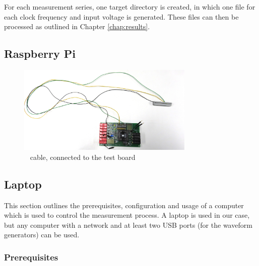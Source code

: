 For each  measurement series, one  target directory  is created, in  which one
file for each clock frequency and  input voltage is generated. These files can
then be processed as outlined in Chapter \ref{chap:results}.


\subsection{Raspberry Pi}
\label{subsec:raspi}


\begin{figure}
    \centering
    \includegraphics[width=0.75\textwidth]{images/expSetup/raspiCable.jpeg}
    \caption{\raspi~ cable, connected to the test board}
    \label{fig:raspiCable}
\end{figure}


\subsection{Laptop}
\label{subsec:laptop}

This section outlines the prerequisites, configuration and usage of a computer
which is  used to  control the  measurement process. A laptop  is used  in our
case, but  any computer with  a network  and at least  two USB ports  (for the
waveform generators) can be used.


\subsubsection{Prerequisites}
\label{subsubsec:laptop:prereqs}

